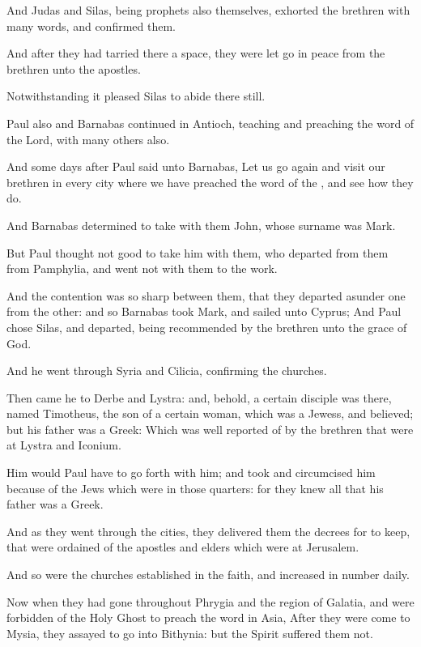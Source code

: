 \Verse And Judas and Silas, being prophets also themselves, exhorted the brethren with many words, and confirmed them.

\Verse And after they had tarried there a space, they were let go in peace from the brethren unto the apostles.

\Verse Notwithstanding it pleased Silas to abide there still.

\Verse Paul also and Barnabas continued in Antioch, teaching and preaching the word of the Lord, with many others also.

\Verse And some days after Paul said unto Barnabas, Let us go again and visit our brethren in every city where we have preached the word of the \LORD, and see how they do.

\Verse And Barnabas determined to take with them John, whose surname was Mark.

\Verse But Paul thought not good to take him with them, who departed from them from Pamphylia, and went not with them to the work.

\Verse And the contention was so sharp between them, that they departed asunder one from the other: and so Barnabas took Mark, and sailed unto Cyprus; \Verse And Paul chose Silas, and departed, being recommended by the brethren unto the grace of God.

\Verse And he went through Syria and Cilicia, confirming the churches.


\Chapter
\Verse Then came he to Derbe and Lystra: and, behold, a certain disciple was there, named Timotheus, the son of a certain woman, which was a Jewess, and believed; but his father was a Greek: \Verse Which was well reported of by the brethren that were at Lystra and Iconium.

\Verse Him would Paul have to go forth with him; and took and circumcised him because of the Jews which were in those quarters: for they knew all that his father was a Greek.

\Verse And as they went through the cities, they delivered them the decrees for to keep, that were ordained of the apostles and elders which were at Jerusalem.

\Verse And so were the churches established in the faith, and increased in number daily.

\Verse Now when they had gone throughout Phrygia and the region of Galatia, and were forbidden of the Holy Ghost to preach the word in Asia, \Verse After they were come to Mysia, they assayed to go into Bithynia: but the Spirit suffered them not.

